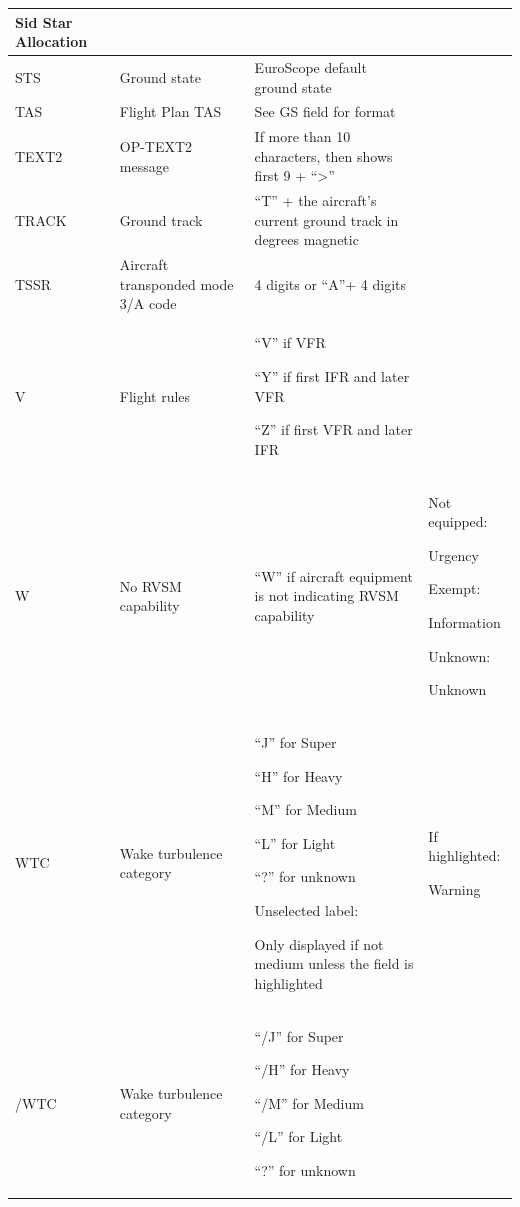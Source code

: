 \documentclass[11pt,a4paper,oldfontcommands]{memoir}
\begin{document}
\begin{longtable}{|p{2.5cm}|p{2.5cm}|p{4.5cm}|p{4.5cm}|}
      Sid Star Allocation \\ \hline
    STS &
      Ground state &
      EuroScope default ground state &
       \\ \hline
    TAS &
      Flight Plan TAS &
      See GS field for format &
       \\ \hline
    TEXT2 &
      OP-TEXT2 message &
      If more than 10 characters, then shows first 9 + “>” &
       \\ \hline
    TRACK &
      Ground track &
      “T” + the aircraft’s current ground track in degrees magnetic &
       \\ \hline
    TSSR &
      Aircraft transponded  mode 3/A code &
      4 digits or “A”+ 4 digits &
       \\ \hline
    V &
      Flight rules &
      “V” if VFR
      
      “Y” if first IFR and later VFR
      
      “Z” if first VFR and later IFR &
       \\ \hline
    W &
      No RVSM capability &
      “W” if aircraft equipment is not  indicating RVSM capability &
      Not equipped: 
      
      Urgency 
      \bigskip
      
      Exempt: 
      
      Information 
      \bigskip
      
      Unknown: 
      
      Unknown \\ \hline
    WTC &
      Wake turbulence  category &
      “J” for Super
      
      “H” for Heavy
      
      “M” for Medium
      
      “L” for Light 
      
      “?” for unknown 
      \bigskip
      
      Unselected label: 
      
      Only displayed if not medium unless the field is highlighted &
      If highlighted: 
      
      Warning \\ \hline
    /WTC &
      Wake turbulence  category &
      “/J” for Super
      
      “/H” for Heavy
      
      “/M” for Medium
      
      “/L” for Light 
      
      “?” for unknown 
      \bigskip
      

\end{longtable}
\end{document}
